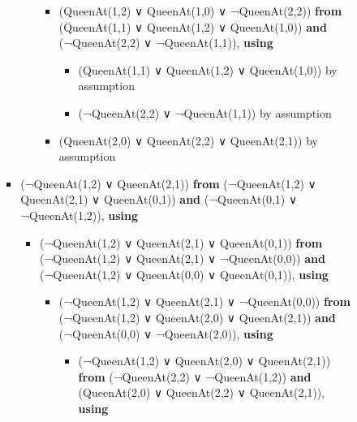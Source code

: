 \begin{itemize}
\begin{itemize}
\begin{itemize}
\begin{itemize}
\begin{itemize}
          \begin{itemize}
          \tightlist
          \item
            (QueenAt(1,2) ∨ QueenAt(1,0) ∨ ¬QueenAt(2,2)) \textbf{from}
            (QueenAt(1,1) ∨ QueenAt(1,2) ∨ QueenAt(1,0)) \textbf{and}
            (¬QueenAt(2,2) ∨ ¬QueenAt(1,1)), \textbf{using}

            \begin{itemize}
            \tightlist
            \item
              (QueenAt(1,1) ∨ QueenAt(1,2) ∨ QueenAt(1,0)) by assumption
            \item
              (¬QueenAt(2,2) ∨ ¬QueenAt(1,1)) by assumption
            \end{itemize}
          \item
            (QueenAt(2,0) ∨ QueenAt(2,2) ∨ QueenAt(2,1)) by assumption
          \end{itemize}
        \end{itemize}
      \item
        (¬QueenAt(1,2) ∨ QueenAt(2,1)) \textbf{from} (¬QueenAt(1,2) ∨
        QueenAt(2,1) ∨ QueenAt(0,1)) \textbf{and} (¬QueenAt(0,1) ∨
        ¬QueenAt(1,2)), \textbf{using}

        \begin{itemize}
        \tightlist
        \item
          (¬QueenAt(1,2) ∨ QueenAt(2,1) ∨ QueenAt(0,1)) \textbf{from}
          (¬QueenAt(1,2) ∨ QueenAt(2,1) ∨ ¬QueenAt(0,0)) \textbf{and}
          (¬QueenAt(1,2) ∨ QueenAt(0,0) ∨ QueenAt(0,1)), \textbf{using}

          \begin{itemize}
          \tightlist
          \item
            (¬QueenAt(1,2) ∨ QueenAt(2,1) ∨ ¬QueenAt(0,0)) \textbf{from}
            (¬QueenAt(1,2) ∨ QueenAt(2,0) ∨ QueenAt(2,1)) \textbf{and}
            (¬QueenAt(0,0) ∨ ¬QueenAt(2,0)), \textbf{using}

            \begin{itemize}
            \tightlist
            \item
              (¬QueenAt(1,2) ∨ QueenAt(2,0) ∨ QueenAt(2,1))
              \textbf{from} (¬QueenAt(2,2) ∨ ¬QueenAt(1,2)) \textbf{and}
              (QueenAt(2,0) ∨ QueenAt(2,2) ∨ QueenAt(2,1)),
              \textbf{using}


\end{itemize}
\end{itemize}
\end{itemize}
\end{itemize}
\end{itemize}
\end{itemize}
\end{itemize}
